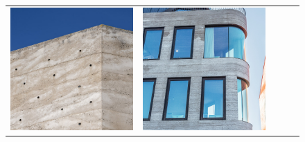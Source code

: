 \begin{figure}[H]
{\begin{tabular}{@{}ccccc@{}}
      \includegraphics[width=\linewidth]{Images/LoRAs/STAMPBETON/Training_images/13.jpg} &
      \includegraphics[width=\linewidth]{Images/LoRAs/STAMPBETON/Training_images/14.jpg} &

\end{tabular}}
\end{figure}
